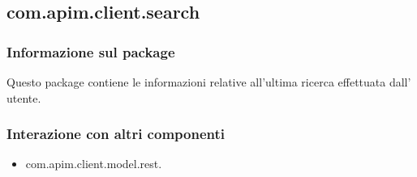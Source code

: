 {	\subsection{com.apim.client.search}{
		\subsubsection{Informazione sul package}{
			Questo package contiene le informazioni relative all'ultima ricerca effettuata dall' utente.
		}
		\subsubsection{Interazione con altri componenti}{
			\begin{itemize}
				\item com.apim.client.model.rest.
			\end{itemize}
}}}
